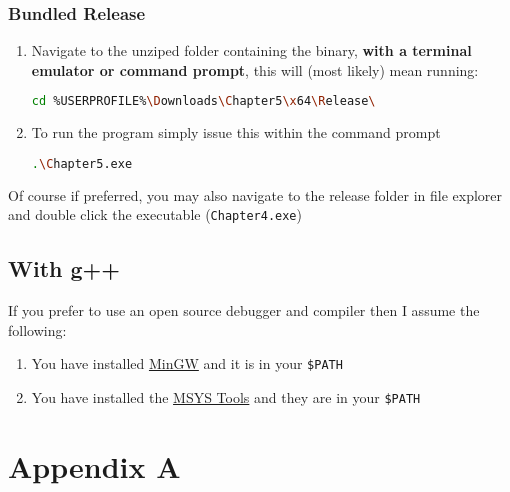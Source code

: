 \documentclass[a4paper]{article}
\begin{document}
      \subsubsection{Bundled Release}
        \begin{enumerate}
          \item Navigate to the unziped folder containing the binary, 
            \textbf{with a terminal emulator or command prompt}, this will
            (most likely) mean running:
            \begin{lstlisting}[language=bash]
              cd %USERPROFILE%\Downloads\Chapter5\x64\Release\
            \end{lstlisting}
          \item To run the program simply issue this within the command
            prompt
            \begin{lstlisting}[language=bash]
              .\Chapter5.exe
            \end{lstlisting}
        \end{enumerate}
        Of course if preferred, you may also navigate to the release folder in
          file explorer and double click the executable (\texttt{Chapter4.exe})
      \subsection{With g++}
        If you prefer to use an open source debugger and compiler then I assume
          the following:
          \begin{enumerate}
            \item You have installed \href{http://www.mingw.org/}{MinGW} and
              it is in your \texttt{\$PATH}
            \item You have installed the
            \href{http://www.mingw.org/wiki/MSYS}{MSYS Tools} and they are in
              your \texttt{\$PATH}
          \end{enumerate}


  \newpage
  \appendix

  \section{Appendix A}
\end{document}
